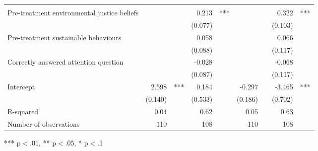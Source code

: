 \documentclass{article}
\begin{document}
\begin{table}[!h]
\begin{tabular}{lllllllll}
  \multicolumn{1}{l}{} \\
\multicolumn{1}{l}{Pre-treatment environmental justice beliefs} &
  \multicolumn{1}{r}{} &
  \multicolumn{1}{l}{} &
  \multicolumn{1}{r}{0.213} &
  \multicolumn{1}{l}{***} &
  \multicolumn{1}{r}{} &
  \multicolumn{1}{l}{} &
  \multicolumn{1}{r}{0.322} &
  \multicolumn{1}{l}{***} \\
\multicolumn{1}{l}{} &
  \multicolumn{1}{r}{} &
  \multicolumn{1}{l}{} &
  \multicolumn{1}{r}{(0.077)} &
  \multicolumn{1}{l}{} &
  \multicolumn{1}{r}{} &
  \multicolumn{1}{l}{} &
  \multicolumn{1}{r}{(0.103)} &
  \multicolumn{1}{l}{} \\
\multicolumn{1}{l}{Pre-treatment sustainable behaviours} &
  \multicolumn{1}{r}{} &
  \multicolumn{1}{l}{} &
  \multicolumn{1}{r}{0.058} &
  \multicolumn{1}{l}{} &
  \multicolumn{1}{r}{} &
  \multicolumn{1}{l}{} &
  \multicolumn{1}{r}{0.066} &
  \multicolumn{1}{l}{} \\
\multicolumn{1}{l}{} &
  \multicolumn{1}{r}{} &
  \multicolumn{1}{l}{} &
  \multicolumn{1}{r}{(0.088)} &
  \multicolumn{1}{l}{} &
  \multicolumn{1}{r}{} &
  \multicolumn{1}{l}{} &
  \multicolumn{1}{r}{(0.117)} &
  \multicolumn{1}{l}{} \\
\multicolumn{1}{l}{Correctly answered attention question} &
  \multicolumn{1}{r}{} &
  \multicolumn{1}{l}{} &
  \multicolumn{1}{r}{-0.028} &
  \multicolumn{1}{l}{} &
  \multicolumn{1}{r}{} &
  \multicolumn{1}{l}{} &
  \multicolumn{1}{r}{-0.068} &
  \multicolumn{1}{l}{} \\
\multicolumn{1}{l}{} &
  \multicolumn{1}{r}{} &
  \multicolumn{1}{l}{} &
  \multicolumn{1}{r}{(0.087)} &
  \multicolumn{1}{l}{} &
  \multicolumn{1}{r}{} &
  \multicolumn{1}{l}{} &
  \multicolumn{1}{r}{(0.117)} &
  \multicolumn{1}{l}{} \\
\multicolumn{1}{l}{Intercept} &
  \multicolumn{1}{r}{2.598} &
  \multicolumn{1}{l}{***} &
  \multicolumn{1}{r}{0.184} &
  \multicolumn{1}{l}{} &
  \multicolumn{1}{r}{-0.297} &
  \multicolumn{1}{l}{} &
  \multicolumn{1}{r}{-3.465} &
  \multicolumn{1}{l}{***} \\
\multicolumn{1}{l}{} &
  \multicolumn{1}{r}{(0.140)} &
  \multicolumn{1}{l}{} &
  \multicolumn{1}{r}{(0.533)} &
  \multicolumn{1}{l}{} &
  \multicolumn{1}{r}{(0.186)} &
  \multicolumn{1}{l}{} &
  \multicolumn{1}{r}{(0.702)} &
  \multicolumn{1}{l}{} \\
\multicolumn{1}{l}{R-squared} &
  \multicolumn{1}{r}{0.04} &
  \multicolumn{1}{l}{} &
  \multicolumn{1}{r}{0.62} &
  \multicolumn{1}{l}{} &
  \multicolumn{1}{r}{0.05} &
  \multicolumn{1}{l}{} &
  \multicolumn{1}{r}{0.63} &
  \multicolumn{1}{l}{} \\
\multicolumn{1}{l}{Number of observations} &
  \multicolumn{1}{r}{110} &
  \multicolumn{1}{l}{} &
  \multicolumn{1}{r}{108} &
  \multicolumn{1}{l}{} &
  \multicolumn{1}{r}{110} &
  \multicolumn{1}{l}{} &
  \multicolumn{1}{r}{108} &
  \multicolumn{1}{l}{} \\
\cline{1-9}
\end{tabular}

\footnotesize{
*** p$<$.01, ** p$<$.05, * p$<$.1
}
\end{table}
\end{document}
